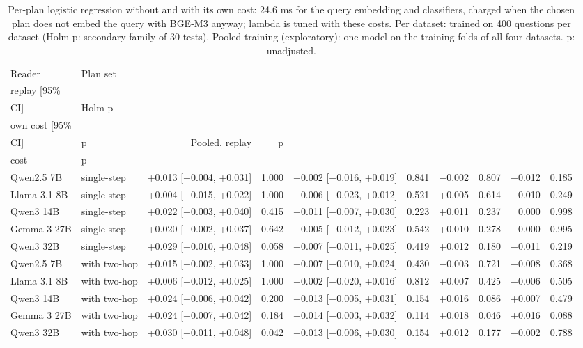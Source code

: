 \begin{table}[t]
\centering\footnotesize
\setlength{\tabcolsep}{2pt}
\caption{Per-plan logistic regression without and with its own cost: 24.6 ms for the query embedding and classifiers, charged when the chosen plan does not embed the query with BGE-M3 anyway; lambda is tuned with these costs. Per dataset: trained on 400 questions per dataset (Holm p: secondary family of 30 tests). Pooled training (exploratory): one model on the training folds of all four datasets. p: unadjusted.}
\label{tab:robust_overhead}
\begin{tabular*}{\linewidth}{@{\extracolsep{\fill}}llrrrrrrrr}
\toprule
Reader & Plan set & \begin{tabular}[b]{@{}r@{}}Per dataset, \\ replay [95\% \\ CI]\end{tabular} & Holm p & \begin{tabular}[b]{@{}r@{}}Per dataset, \\ own cost [95\% \\ CI]\end{tabular} & p & Pooled, replay & p  & \begin{tabular}[b]{@{}r@{}}Pooled, own \\ cost\end{tabular} & p   \\
\midrule
Qwen2.5 7B & single-step & +0.013 [$-$0.004, +0.031] & 1.000 & +0.002 [$-$0.016, +0.019] & 0.841 & $-$0.002 & 0.807 & $-$0.012 & 0.185 \\
Llama 3.1 8B & single-step & +0.004 [$-$0.015, +0.022] & 1.000 & $-$0.006 [$-$0.023, +0.012] & 0.521 & +0.005 & 0.614 & $-$0.010 & 0.249 \\
Qwen3 14B & single-step & +0.022 [+0.003, +0.040] & 0.415 & +0.011 [$-$0.007, +0.030] & 0.223 & +0.011 & 0.237 & 0.000 & 0.998 \\
Gemma 3 27B & single-step & +0.020 [+0.002, +0.037] & 0.642 & +0.005 [$-$0.012, +0.023] & 0.542 & +0.010 & 0.278 & 0.000 & 0.995 \\
Qwen3 32B & single-step & +0.029 [+0.010, +0.048] & 0.058 & +0.007 [$-$0.011, +0.025] & 0.419 & +0.012 & 0.180 & $-$0.011 & 0.219 \\
Qwen2.5 7B & with two-hop & +0.015 [$-$0.002, +0.033] & 1.000 & +0.007 [$-$0.010, +0.024] & 0.430 & $-$0.003 & 0.721 & $-$0.008 & 0.368 \\
Llama 3.1 8B & with two-hop & +0.006 [$-$0.012, +0.025] & 1.000 & $-$0.002 [$-$0.020, +0.016] & 0.812 & +0.007 & 0.425 & $-$0.006 & 0.505 \\
Qwen3 14B & with two-hop & +0.024 [+0.006, +0.042] & 0.200 & +0.013 [$-$0.005, +0.031] & 0.154 & +0.016 & 0.086 & +0.007 & 0.479 \\
Gemma 3 27B & with two-hop & +0.024 [+0.007, +0.042] & 0.184 & +0.014 [$-$0.003, +0.032] & 0.114 & +0.018 & 0.046 & +0.016 & 0.088 \\
Qwen3 32B & with two-hop & +0.030 [+0.011, +0.048] & 0.042 & +0.013 [$-$0.006, +0.030] & 0.154 & +0.012 & 0.177 & $-$0.002 & 0.788 \\
\bottomrule
\end{tabular*}
\end{table}
